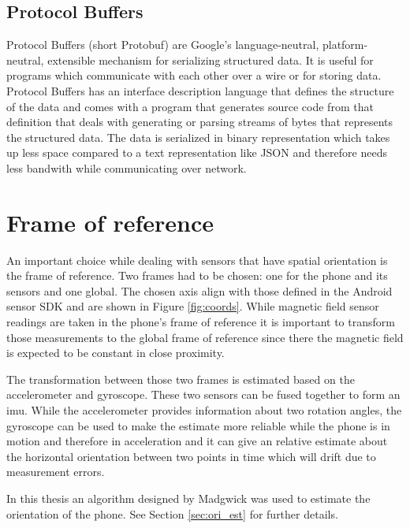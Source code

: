 \subsection{Protocol Buffers}

Protocol Buffers (short Protobuf) are Google's language-neutral, platform-neutral, extensible mechanism for serializing structured data. It is useful for programs which communicate with each other over a wire or for storing data. Protocol Buffers has an interface description language that defines the structure of the data and comes with a program that generates source code from that definition that deals with generating or parsing streams of bytes that represents the structured data. The data is serialized in binary representation which takes up less space compared to a text representation like JSON and therefore needs less bandwith while communicating over network.

\section{Frame of reference}

An important choice while dealing with sensors that have spatial orientation is the frame of reference. Two frames had to be chosen: one for the phone and its sensors and one global. The chosen axis align with those defined in the Android sensor SDK and are shown in Figure \ref{fig:coords}. While magnetic field sensor readings are taken in the phone's frame of reference it is important to transform those measurements to the global frame of reference since there the magnetic field is expected to be constant in close proximity.

The transformation between those two frames is estimated based on the accelerometer and gyroscope. These two sensors can be fused together to form an \gls{imu}. While the accelerometer provides information about two rotation angles, the gyroscope can be used to make the estimate more reliable while the phone is in motion and therefore in acceleration and it can give an relative estimate about the horizontal orientation between two points in time which will drift due to measurement errors.

In this thesis an algorithm designed by Madgwick was used to estimate the orientation of the phone. See Section \ref{sec:ori_est} for further details.

